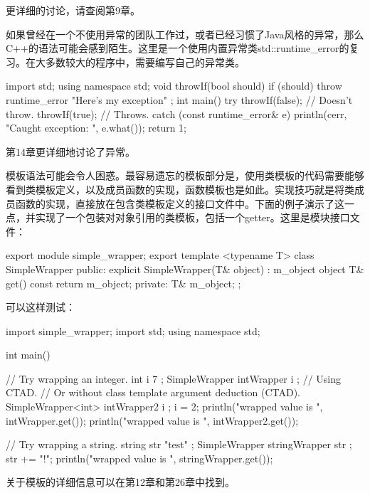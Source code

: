 更详细的讨论，请查阅第9章。


如果曾经在一个不使用异常的团队工作过，或者已经习惯了Java风格的异常，那么C++的语法可能会感到陌生。这里是一个使用内置异常类std::runtime\_error的复习。在大多数较大的程序中，需要编写自己的异常类。

\begin{cpp}
import std;
using namespace std;
void throwIf(bool should)
{
    if (should) {
        throw runtime_error { "Here's my exception" };
    }
}
int main()
{
    try {
        throwIf(false); // Doesn't throw.
        throwIf(true); // Throws.
    } catch (const runtime_error& e) {
        println(cerr, "Caught exception: {}", e.what());
        return 1;
    }
}
\end{cpp}

第14章更详细地讨论了异常。


模板语法可能会令人困惑。最容易遗忘的模板部分是，使用类模板的代码需要能够看到类模板定义，以及成员函数的实现，函数模板也是如此。实现技巧就是将类成员函数的实现，直接放在包含类模板定义的接口文件中。下面的例子演示了这一点，并实现了一个包装对对象引用的类模板，包括一个getter。这里是模块接口文件：

\begin{cpp}
export module simple_wrapper;
export template <typename T>
class SimpleWrapper
{
    public:
        explicit SimpleWrapper(T& object) : m_object { object } { }
        T& get() const { return m_object; }
    private:
        T& m_object;
};
\end{cpp}

可以这样测试：

\begin{cpp}
import simple_wrapper;
import std;
using namespace std;

int main()
{
    // Try wrapping an integer.
    int i { 7 };
    SimpleWrapper intWrapper { i }; // Using CTAD.
    // Or without class template argument deduction (CTAD).
    SimpleWrapper<int> intWrapper2 { i };
    i = 2;
    println("wrapped value is {}", intWrapper.get());
    println("wrapped value is {}", intWrapper2.get());

    // Try wrapping a string.
    string str { "test" };
    SimpleWrapper stringWrapper { str };
    str += "!";
    println("wrapped value is {}", stringWrapper.get());
}
\end{cpp}

关于模板的详细信息可以在第12章和第26章中找到。

